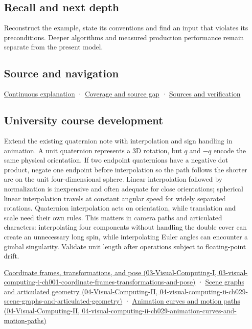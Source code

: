 \subsection{Recall and next depth}\label{appendix-8e61ab68f6b2-recall-and-next-depth}

Reconstruct the example, state its conventions and find an input that violates its preconditions. Deeper algorithms and measured production performance remain separate from the present model.

\subsection{Source and navigation}\label{appendix-8e61ab68f6b2-source-and-navigation}

\hyperref[01-foundations-i-ch018-keep-the-promises-visible-while-moving-between-representations]{Continuous explanation} · \hyperref[appendix-fd090d982a15-phase-7---parts-601-700]{Coverage and source gap} · \hyperref[appendix-a103e7846d21-phase-7---source-analysis-and-verification]{Sources and verification}

\subsection{University course development}\label{appendix-8e61ab68f6b2-university-course-development}

Extend the existing quaternion note with interpolation and sign handling in animation. A unit quaternion represents a 3D rotation, but \(q\) and \(-q\) encode the same physical orientation. If two endpoint quaternions have a negative dot product, negate one endpoint before interpolation so the path follows the shorter arc on the unit four-dimensional sphere. Linear interpolation followed by normalization is inexpensive and often adequate for close orientations; spherical linear interpolation travels at constant angular speed for widely separated rotations. Quaternion interpolation acts on orientation, while translation and scale need their own rules. This matters in camera paths and articulated characters: interpolating four components without handling the double cover can create an unnecessary long spin, while interpolating Euler angles can encounter a gimbal singularity. Validate unit length after operations subject to floating-point drift.

\href{../03-Visual-Computing-I/main.pdf\#nameddest=03-visual-computing-i-ch001-coordinate-frames-transformations-and-pose}{Coordinate frames, transformations, and pose (03-Visual-Computing-I, 03-visual-computing-i-ch001-coordinate-frames-transformations-and-pose)} · \href{../04-Visual-Computing-II/main.pdf\#nameddest=04-visual-computing-ii-ch029-scene-graphs-and-articulated-geometry}{Scene graphs and articulated geometry (04-Visual-Computing-II, 04-visual-computing-ii-ch029-scene-graphs-and-articulated-geometry)} · \href{../04-Visual-Computing-II/main.pdf\#nameddest=04-visual-computing-ii-ch029-animation-curves-and-motion-paths}{Animation curves and motion paths (04-Visual-Computing-II, 04-visual-computing-ii-ch029-animation-curves-and-motion-paths)}
